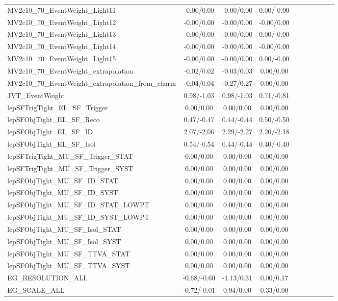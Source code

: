 \begin{table}[h]
\begin{center}
\begin{tabular}{l|ccccccccc}
MV2c10\_70\_EventWeight\_Light11 &-0.00/0.00 &-0.00/0.00 &0.00/-0.00 \\
MV2c10\_70\_EventWeight\_Light12 &-0.00/0.00 &-0.00/0.00 &-0.00/0.00 \\
MV2c10\_70\_EventWeight\_Light13 &-0.00/0.00 &-0.00/0.00 &0.00/-0.00 \\
MV2c10\_70\_EventWeight\_Light14 &-0.00/0.00 &-0.00/0.00 &-0.00/0.00 \\
MV2c10\_70\_EventWeight\_Light15 &-0.00/0.00 &-0.00/0.00 &0.00/-0.00 \\
MV2c10\_70\_EventWeight\_extrapolation &-0.02/0.02 &-0.03/0.03 &0.00/0.00 \\
MV2c10\_70\_EventWeight\_extrapolation\_from\_charm &-0.04/0.04 &-0.27/0.27 &0.00/0.00 \\
JVT\_EventWeight &0.98/-1.03 &0.98/-1.03 &0.71/-0.81 \\
lepSFTrigTight\_EL\_SF\_Trigger &0.00/0.00 &0.00/0.00 &0.00/0.00 \\
lepSFObjTight\_EL\_SF\_Reco &0.47/-0.47 &0.44/-0.44 &0.50/-0.50 \\
lepSFObjTight\_EL\_SF\_ID &2.07/-2.06 &2.29/-2.27 &2.20/-2.18 \\
lepSFObjTight\_EL\_SF\_Isol &0.54/-0.54 &0.44/-0.44 &0.40/-0.40 \\
lepSFTrigTight\_MU\_SF\_Trigger\_STAT &0.00/0.00 &0.00/0.00 &0.00/0.00 \\
lepSFTrigTight\_MU\_SF\_Trigger\_SYST &0.00/0.00 &0.00/0.00 &0.00/0.00 \\
lepSFObjTight\_MU\_SF\_ID\_STAT &0.00/0.00 &0.00/0.00 &0.00/0.00 \\
lepSFObjTight\_MU\_SF\_ID\_SYST &0.00/0.00 &0.00/0.00 &0.00/0.00 \\
lepSFObjTight\_MU\_SF\_ID\_STAT\_LOWPT &0.00/0.00 &0.00/0.00 &0.00/0.00 \\
lepSFObjTight\_MU\_SF\_ID\_SYST\_LOWPT &0.00/0.00 &0.00/0.00 &0.00/0.00 \\
lepSFObjTight\_MU\_SF\_Isol\_STAT &0.00/0.00 &0.00/0.00 &0.00/0.00 \\
lepSFObjTight\_MU\_SF\_Isol\_SYST &0.00/0.00 &0.00/0.00 &0.00/0.00 \\
lepSFObjTight\_MU\_SF\_TTVA\_STAT &0.00/0.00 &0.00/0.00 &0.00/0.00 \\
lepSFObjTight\_MU\_SF\_TTVA\_SYST &0.00/0.00 &0.00/0.00 &0.00/0.00 \\
EG\_RESOLUTION\_ALL &-0.68/-0.60 &-1.13/0.31 &0.00/0.17 \\
EG\_SCALE\_ALL &-0.72/-0.01 &0.94/0.00 &0.33/0.00 \\

\end{tabular}
\end{center}
\end{table}
